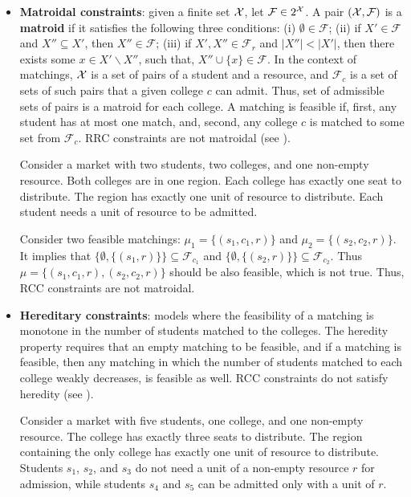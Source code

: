 \begin{itemize}
    \item \textbf{Matroidal constraints}: given a finite set $\operatorname{{\color{black}\mathcal{X}}}$, let $\mathcal{F}\in 2^{\operatorname{{\color{black}\mathcal{X}}}}$. A pair $(\operatorname{{\color{black}\mathcal{X}}},\mathcal{F})$ is a \textbf{matroid} if it satisfies the following three conditions: (i) $\emptyset\in \mathcal{F}$; (ii) if $X'\in\mathcal{F}$ and $X''\subseteq X'$, then $X''\in\mathcal{F}$; (iii) if $X',X''\in\mathcal{F}_r$ and $|X''|<|X'|$, then there exists some $x\in X'\backslash X''$, such that, $X''\cup\{x\}\in \mathcal{F}$. In the context of matchings, $\operatorname{{\color{black}\mathcal{X}}}$ is a set of pairs of a student and a resource, and $\mathcal{F}_c$ is a set of sets of such pairs that a given college $c$ can admit. Thus, set of admissible sets of pairs is a matroid for each college. A matching is feasible if, first, any student has at most one match, and, second, any college $c$ is matched to some set from $\mathcal{F}_c$. RRC constraints are not matroidal (see ).

    \begin{example}\label{Ex1}
        Consider a market with two students, two colleges, and one non-empty resource. Both colleges are in one region. Each college has exactly one seat to distribute. The region has exactly one unit of resource to distribute. Each student needs a unit of resource to be admitted.

         Consider two feasible matchings: $\mu_1 =\{(s_1,c_1,r)\}$ and $\mu_2 =\{(s_2,c_2,r)\}$. It implies that $\{\emptyset,\{(s_1,r)\}\}\subseteq\mathcal{F}_{c_1}$ and $\{\emptyset,\{(s_2,r)\}\}\subseteq\mathcal{F}_{c_2}$. Thus $\mu = \{(s_1,c_1,r),(s_2,c_2,r)\}$ should be also feasible, which is not true. Thus, RCC constraints are not matroidal.
    \end{example}

    \item \textbf{Hereditary constraints}: models where the feasibility of a matching is monotone in the number of students matched to the colleges. The heredity property requires that an empty matching to be feasible, and if a matching is feasible, then any matching in which the number of students matched to each college weakly decreases, is feasible as well. RCC constraints do not satisfy heredity (see ).

    \begin{example}\label{Ex2}
        Consider a market with five students, one college, and one non-empty resource. The college has exactly three seats to distribute. The region containing the only college has exactly one unit of resource to distribute. Students $s_1$, $s_2$, and $s_3$ do not need a unit of a non-empty resource $r$ for admission, while students $s_4$ and $s_5$ can be admitted only with a unit of $r$.


\end{example}
\end{itemize}
